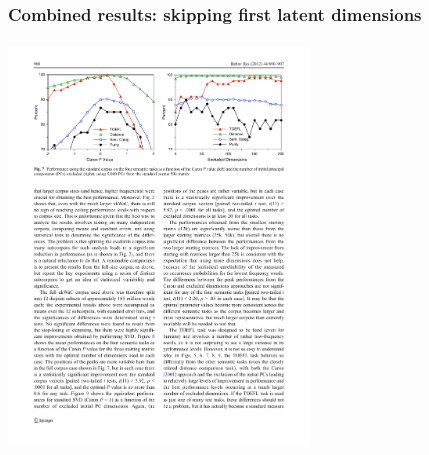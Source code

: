 \documentclass[t]{beamer} %
\begin{document}
\begin{frame}
  \frametitle{Combined results: skipping first latent dimensions}
  \framesubtitle{\citep[p.~900, Fig.~7]{Bullinaria:Levy:12}}

  \ungap[1.5]
  \begin{center}
    \includegraphics[width=8cm]{img/BullinariaLevy2012_p900_fig7_skipdim}
  \end{center}

  \ungap[.5]
\end{frame}
\end{document}
